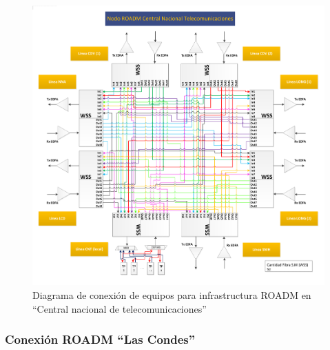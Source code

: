 \begin{figure}[H]
  \centering
  \includegraphics[width=17cm]{Imagenes/CNT.pdf}
  \caption{Diagrama de conexión de equipos para infrastructura ROADM
    en ``Central nacional de telecomunicaciones''}
  \label{fig:drcnt}
\end{figure}

\subsubsection{Conexión ROADM ``Las Condes''}
\label{sec:drlcd}

